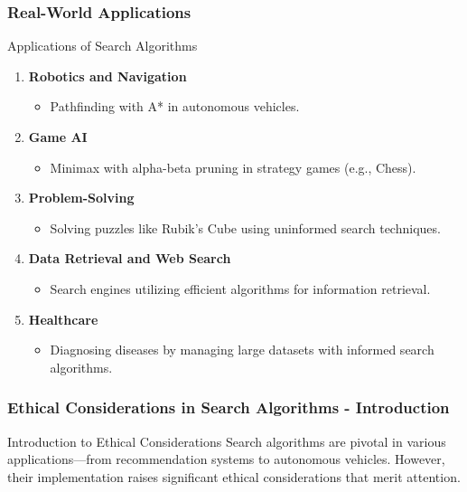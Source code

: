 \documentclass[aspectratio=169]{beamer}
\begin{document}
\begin{frame}[fragile]
    \frametitle{Real-World Applications}
    \begin{block}{Applications of Search Algorithms}
        \begin{enumerate}
            \item \textbf{Robotics and Navigation}
            \begin{itemize}
                \item Pathfinding with A* in autonomous vehicles.
            \end{itemize}
            
            \item \textbf{Game AI}
            \begin{itemize}
                \item Minimax with alpha-beta pruning in strategy games (e.g., Chess).
            \end{itemize}

            \item \textbf{Problem-Solving}
            \begin{itemize}
                \item Solving puzzles like Rubik's Cube using uninformed search techniques.
            \end{itemize}

            \item \textbf{Data Retrieval and Web Search}
            \begin{itemize}
                \item Search engines utilizing efficient algorithms for information retrieval.
            \end{itemize}
            
            \item \textbf{Healthcare}
            \begin{itemize}
                \item Diagnosing diseases by managing large datasets with informed search algorithms.
            \end{itemize}
        \end{enumerate}
    \end{block}
\end{frame}

\begin{frame}[fragile]
    \frametitle{Ethical Considerations in Search Algorithms - Introduction}
    \begin{block}{Introduction to Ethical Considerations}
        Search algorithms are pivotal in various applications—from recommendation systems to autonomous vehicles. However, their implementation raises significant ethical considerations that merit attention.
    \end{block}
\end{frame}
\end{document}
